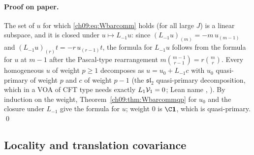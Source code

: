 \paragraph{Proof on paper.} The set of $u$ for which \eqref{ch09:eq:Wbarcomm} holds (for all large
$J$) is a linear subspace, and it is closed under $u\mapsto L_{-1}u$: since
$(L_{-1}u)_{(m)}=-m\,u_{(m-1)}$ and $(L_{-1}u)_{(r)}t=-r\,u_{(r-1)}t$, the formula for $L_{-1}u$ follows
from the formula for $u$ at $m-1$ after the Pascal-type rearrangement
$m\binom{m-1}{r-1}=r\binom mr$. Every homogeneous $u$ of weight $p\ge1$ decomposes as
$u=u_0+L_{-1}c$ with $u_0$ quasi-primary of weight $p$ and $c$ of weight $p-1$ (the
$\mathfrak{sl}_2$ quasi-primary decomposition, which in a VOA of CFT type needs exactly
$L_1\mathcal{V}_1=0$; Lean name , ). By
induction on the weight, Theorem~\ref{ch09:thm:Wbarcommqp} for $u_0$ and the closure under $L_{-1}$
give the formula for $u$; weight $0$ is $\C\mathbf1$, which is quasi-primary. \qed

\subsection{Locality and translation covariance}

